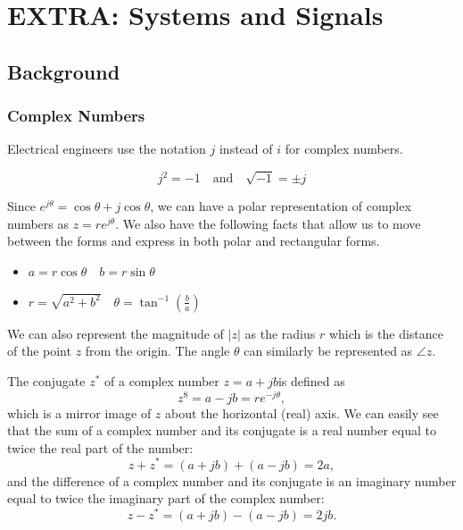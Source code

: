 \section{EXTRA: Systems and Signals}
\subsection{Background}
\subsubsection{Complex Numbers}
Electrical engineers use the notation $j$ instead of $i$ for complex numbers.

\begin{equation}
    j^2 = -1 \quad \text{and} \quad \sqrt{-1} = \pm j
\end{equation}

Since $e^{j \theta} = \cos \theta + j \cos \theta$, we can have a polar representation of complex numbers as $z = re^{j \theta}$.
We also have the following facts that allow us to move between the forms and express in both polar and rectangular forms.
\begin{itemize}
    \item $a = r \cos \theta \quad b = r \sin \theta$
    \item $r = \sqrt{a^2 + b^2} \quad \theta = \tan^{-1} (\frac{b}{a}) $
\end{itemize} 

We can also represent the magnitude of $|z|$ as the radius $r$ which is the distance of the point $z$ from the origin.
The angle $\theta$ can similarly be represented as $\angle z$.

The conjugate $z^*$ of a complex number $z=a+jb$is defined as 
\begin{equation}
    z^8 = a - jb = re^{-j \theta},
\end{equation}
which is a mirror image of $z$ about the horizontal (real) axis.
We can easily see that the sum of a complex number and its conjugate is a real number equal to twice the real part of the number:
\begin{equation}
    z + z^* = (a+jb) + (a-jb) = 2a,
\end{equation}
and the difference of a complex number and its conjugate is an imaginary number equal to twice the imaginary part of the complex number:
\begin{equation}
    z - z^* = (a+jb) - (a-jb) = 2jb.
\end{equation}

